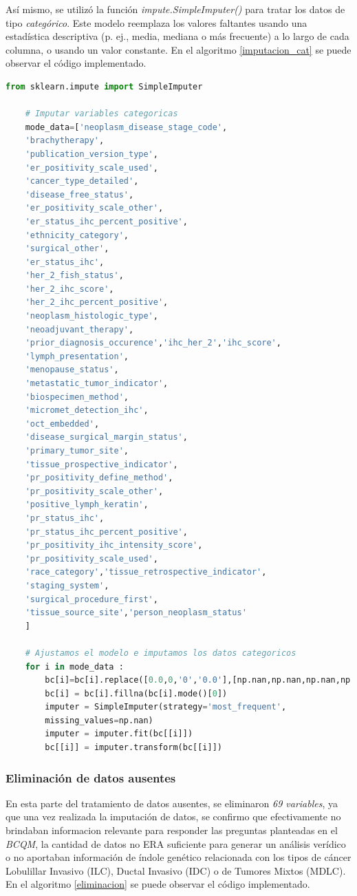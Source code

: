  Así mismo, se utilizó la función \textit{impute.SimpleImputer()} para tratar los datos de tipo \textit{categórico}. Este modelo reemplaza los valores faltantes usando una estadística descriptiva (p. ej., media, mediana o más frecuente) a lo largo de cada columna, o usando un valor constante. En el algoritmo \ref{imputacion_cat} se puede observar el código implementado.
  
   \begin{lstlisting}[basicstyle=\scriptsize,language=Python, label=imputacion_cat, caption=Imputar datos categóricos con sklearn en Python.]
  	from sklearn.impute import SimpleImputer
  	
	# Imputar variables categoricas
	mode_data=['neoplasm_disease_stage_code',
	'brachytherapy',
	'publication_version_type',
	'er_positivity_scale_used',
	'cancer_type_detailed',
	'disease_free_status',
	'er_positivity_scale_other',
	'er_status_ihc_percent_positive',
	'ethnicity_category',
	'surgical_other',
	'er_status_ihc',
	'her_2_fish_status',
	'her_2_ihc_score',
	'her_2_ihc_percent_positive',
	'neoplasm_histologic_type',
	'neoadjuvant_therapy',
	'prior_diagnosis_occurence','ihc_her_2','ihc_score',
	'lymph_presentation',
	'menopause_status',
	'metastatic_tumor_indicator',
	'biospecimen_method',
	'micromet_detection_ihc',
	'oct_embedded',
	'disease_surgical_margin_status',
	'primary_tumor_site',
	'tissue_prospective_indicator',
	'pr_positivity_define_method',
	'pr_positivity_scale_other',
	'positive_lymph_keratin',
	'pr_status_ihc',
	'pr_status_ihc_percent_positive',
	'pr_positivity_ihc_intensity_score',
	'pr_positivity_scale_used',
	'race_category','tissue_retrospective_indicator',
	'staging_system',
	'surgical_procedure_first',
	'tissue_source_site','person_neoplasm_status'
	]
  		
  	# Ajustamos el modelo e imputamos los datos categoricos
  	for i in mode_data :
	  	bc[i]=bc[i].replace([0.0,0,'0','0.0'],[np.nan,np.nan,np.nan,np.nan])
	  	bc[i] = bc[i].fillna(bc[i].mode()[0])
	  	imputer = SimpleImputer(strategy='most_frequent', 
	  	missing_values=np.nan)
	  	imputer = imputer.fit(bc[[i]])
	  	bc[[i]] = imputer.transform(bc[[i]])
  \end{lstlisting}
 
 
\subsubsection{Eliminación de datos ausentes}

En esta parte del tratamiento de datos ausentes, se eliminaron \textit{69 variables}, ya que una vez realizada la imputación de datos, se confirmo que efectivamente no brindaban informacion relevante para responder las preguntas planteadas en el \textit{BCQM}, la cantidad de datos no ERA suficiente para generar un análisis verídico o  no aportaban información de índole genético relacionada con los tipos de cáncer Lobulillar Invasivo (ILC), Ductal Invasivo (IDC) o de Tumores Mixtos (MDLC). En el algoritmo \ref{eliminacion} se puede observar el código implementado.
 
